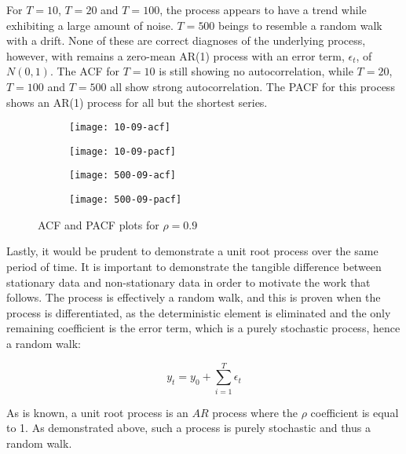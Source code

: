 For $T = 10$, $T = 20$ and $T = 100$, the process appears to have a trend while exhibiting a large amount of noise. $T = 500$ beings to resemble a random walk with a drift. None of these are correct diagnoses of the underlying process, however, with remains a zero-mean AR(1) process with an error term, $\epsilon_t$, of $N(0,1)$. The ACF for $T = 10$ is still showing no autocorrelation, while $T = 20$, $T = 100$ and $T = 500$ all show strong autocorrelation. The PACF for this process shows an AR(1) process for all but the shortest series.

\begin{figure}[htp]
	\centering
	\begin{subfigure}{0.23\textwidth}
		\centering
		\texttt{[image: 10-09-acf]}
	\end{subfigure}
	\begin{subfigure}{0.23\textwidth}
		\centering
		\texttt{[image: 10-09-pacf]}
	\end{subfigure}
	\begin{subfigure}{0.23\textwidth}
		\centering
		\texttt{[image: 500-09-acf]}
	\end{subfigure}
	\begin{subfigure}{0.23\textwidth}
		\centering
		\texttt{[image: 500-09-pacf]}
	\end{subfigure}
	\caption{ACF and PACF plots for $\rho = 0.9$}
\end{figure}


Lastly, it would be prudent to demonstrate a unit root process over the same period of time. It is important to demonstrate the tangible difference between stationary data and non-stationary data in order to motivate the work that follows. The process is effectively a random walk, and this is proven when the process is differentiated, as the deterministic element is eliminated and the only remaining coefficient is the error term, which is a purely stochastic process, hence a random walk:


\begin{equation}
y_t = y_0 + \sum_{i=1}^{T}\epsilon_t
\end{equation}


As is known, a unit root process is an $AR$ process where the $\rho$ coefficient is equal to 1. As demonstrated above, such a process is purely stochastic and thus a random walk.


